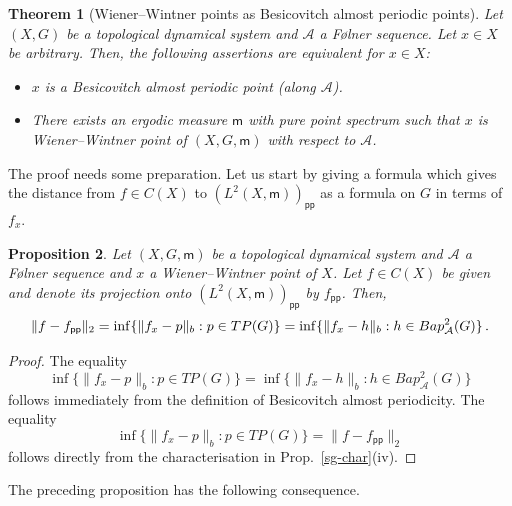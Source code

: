 \documentclass [14pt]{amsart}
\numberwithin{equation}{section}
\newcommand{\cA}{{\mathcal A}}
\newcommand{\mm}{\mathsf{m}}
\newcommand{\bap}{Bap}
\newtheorem{theorem}{Theorem}[section]
\newtheorem{prop}[theorem]{Proposition}
\begin{document}
\begin{theorem}[Wiener--Wintner points as Besicovitch almost periodic points]\label{sg-vs-bes} Let $(X,G)$ be a topological dynamical system and $\cA$ a F\o lner sequence. Let $x \in X$ be arbitrary. Then, the following assertions are equivalent for $x\in X$:

\begin{itemize}
\item[(i)]  $x$ is a Besicovitch almost periodic point (along $\cA$).
\item[(ii)] There exists an ergodic measure $\mm$ with pure point spectrum such that $x$ is Wiener--Wintner point of $(X,G,\mm)$ with respect to $\cA$.
\end{itemize}
\end{theorem}





The proof needs some preparation.   Let us start by giving  a formula which gives the distance from $f \in C(X)$ to $(L^2(X,\mm))_{\mathsf{pp}}$ as a formula on $G$ in terms of $f_x$.

\begin{prop}\label{dist-pp} Let $(X,G,\mm)$ be a topological dynamical system and $\cA$ a F\o lner sequence and $x$ a Wiener--Wintner point of $X$. Let
$f \in C(X)$ be given and denote its projection onto $(L^2(X,\mm))_{\mathsf{pp}}$ by $f_{\mathsf{pp}}$. Then,
$$
 \|f - f_{\mathsf{pp}}\|_2 = \inf\{ \| f_x  - p \|_{b} : p \in TP (G) \}\\
 = \inf\{ \| f_x - h \|_{b} : h \in \bap^2_{\cA}(G) \} \,.$$

\end{prop}
\begin{proof}
The equality
\[
\inf\{ \| f_x - p \|_{b} : p \in TP(G) \} =\inf\{ \| f_x  - h \|_{b} : h \in  \bap^2_{\cA}(G) \}
\]
follows immediately from the definition of Besicovitch almost periodicity.
The equality
\[
\inf\{ \| f_x  - p \|_{b} : p \in TP(G) \} = \| f - f_{\mathsf{pp}} \|_2
\]
follows directly from the characterisation in Prop.~\ref{sg-char}(iv).
\end{proof}

The preceding proposition has the following consequence.
\end{document}
